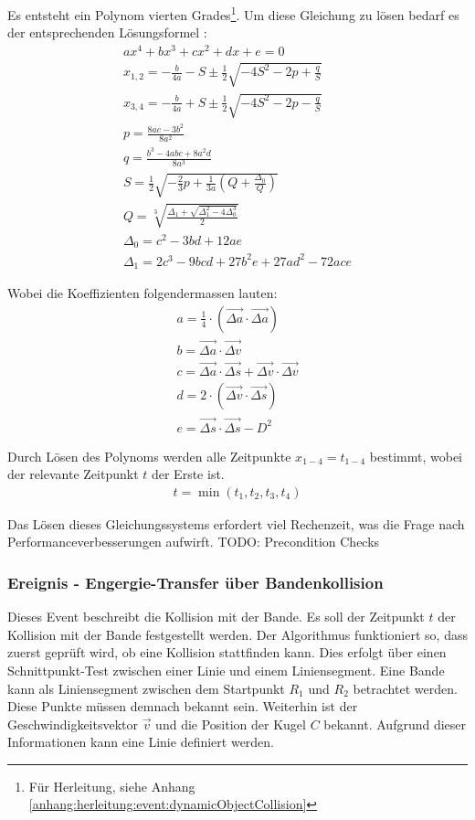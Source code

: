 Es entsteht ein Polynom vierten Grades\footnote{Für Herleitung, siehe Anhang \ref{anhang:herleitung:event:dynamicObjectCollision}}.
Um diese Gleichung zu lösen bedarf es der entsprechenden Lösungsformel \cite{wiki.polynom:1}:
\begin{align}
    ax^4 + bx^3 + cx^2 + dx + e = 0\\
    x_{1,2} = -\frac{b}{4a} - S \pm \frac{1}{2}\sqrt{-4S^2 - 2p + \frac{q}{S}}\\
    x_{3,4} = -\frac{b}{4a} + S \pm \frac{1}{2}\sqrt{-4S^2 - 2p - \frac{q}{S}}\\
    p = \frac{8ac - 3b^2}{8a^2}\\
    q = \frac{b^3 - 4abc + 8a^{2}d}{8a^3}\\
    S = \frac{1}{2}\sqrt{-\frac{2}{3}p + \frac{1}{3a}(Q + \frac{\Delta_0}{Q})}\\
    Q = \sqrt[3]{\frac{\Delta_1 + \sqrt{\Delta_{1}^2 - 4\Delta_{0}^3}}{2}}\\
    \Delta_0 = c^2 - 3bd + 12ae\\
    \Delta_1 = 2c^3 - 9bcd + 27b^{2}e + 27ad^2 - 72ace
\end{align}

Wobei die Koeffizienten folgendermassen lauten:
\begin{align}
    a = \frac{1}{4} \cdot (\vec{\Delta a} \cdot \vec{\Delta a})\\
    b = \vec{\Delta a} \cdot \vec{\Delta v}\\
    c = \vec{\Delta a} \cdot \vec{\Delta s} + \vec{\Delta v} \cdot \vec{\Delta v}\\
    d = 2 \cdot (\vec{\Delta v} \cdot \vec{\Delta s})\\
    e = \vec{\Delta s} \cdot \vec{\Delta s} - D^2
\end{align}

Durch Lösen des Polynoms werden alle Zeitpunkte $x_{1-4} = t_{1-4}$ bestimmt, wobei der relevante Zeitpunkt $t$ der
Erste ist.
\begin{align}
    t = \min{(t_1, t_2, t_3, t_4)}
\end{align}

Das Lösen dieses Gleichungssystems erfordert viel Rechenzeit, was die Frage nach Performanceverbesserungen aufwirft.
TODO: Precondition Checks

\subsubsection{Ereignis - Engergie-Transfer über Bandenkollision}
Dieses Event beschreibt die Kollision mit der Bande. Es soll der Zeitpunkt $t$ der Kollision mit der Bande festgestellt werden.
Der Algorithmus funktioniert so, dass zuerst geprüft wird, ob eine Kollision stattfinden kann.
Dies erfolgt über einen Schnittpunkt-Test zwischen einer Linie und einem Liniensegment.
Eine Bande kann als Liniensegment zwischen dem Startpunkt $R_1$ und $R_2$ betrachtet werden. Diese Punkte müssen demnach bekannt sein.
Weiterhin ist der Geschwindigkeitsvektor $\vec{v}$ und die Position der Kugel $C$ bekannt.
Aufgrund dieser Informationen kann eine Linie definiert werden.

